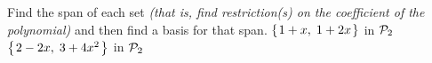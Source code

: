 
\begin{Exercise}[
name={},
title={}, 
difficulty=0,
origin={\cite{JH}}]
Find the span of each set \textit{(that is, find restriction(s) on the coefficient of the polynomial)} and then find a basis for that span.
\Question $\mbox{$\left\{\hspace{0.1em}1+x,\;1+2x\hspace{0.1em}\right\}$}$ in $\mathcal{P}_2$
\Question $\mbox{$\left\{\hspace{0.1em}2-2x,\;3+4x^2\hspace{0.1em}\right\}$}$ in $\mathcal{P}_2$
\end{Exercise}

